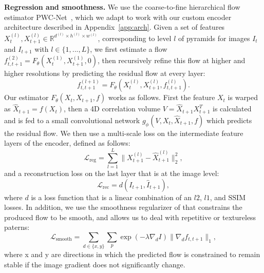 \documentclass{article} %
\newcommand{\parspace}{\vspace{0mm}}
\begin{document}
\noindent\textbf{Regression and smoothness.} We use the coarse-to-fine hierarchical flow estimator PWC-Net~\citep{sun2018pwcnet}, which we adapt to work with our custom encoder architecture described in Appendix~\ref{app:arch}. Given a set of features $X_{t}^{(l)}, X_{t+1}^{(l)} \in \mathbb{R}^{d^{(l)} \times h^{(l)} \times w^{(l)}}$, corresponding to level $l$ of pyramids for images $I_{t}$ and $I_{t+1}$ with $l \in \{1, ..., L\}$, we first estimate a flow $f_{t,t+1}^{(2)} = F_{\theta}(X_{t}^{(1)}, X_{t+1}^{(1)}, 0)$, then recursively refine this flow at higher and higher resolutions by predicting the residual flow at every layer:
\begin{equation}
    f_{t,t+1}^{(l+1)} = F_{\theta}(X_{t}^{(l)}, X_{t+1}^{(l)}, f_{t,t+1}^{(l)}).
\end{equation}
Our estimator $F_{\theta}(X_{t}, X_{t+1}, f)$ works as follows. First the feature $X_{t}$ is warped as $\hat{X}_{t+1} = f(X_{t})$, then a 4D correlation volume $V = \hat{X}_{t+1}X_{t+1}^T$ is calculated and is fed to a small convolutional network $g_{\phi}(V, X_{t}, \hat{X}_{t+1}, f)$ which predicts the residual flow. We then use a multi-scale loss on the intermediate feature layers of the encoder, defined as follows:
\begin{equation} \label{eq:reg_loss}
    \mathcal{L}_{\mathrm{reg}} = \sum_{l=1}^{L} \| X^{(l)}_{t+1} - \hat{X}_{t+1}^{(l)} \|^{2}_{2},
\end{equation}
and a reconstruction loss on the last layer that is at the image level:
\begin{equation} \label{eq:reg_loss}
    \mathcal{L}_\mathrm{{rec}} = d(I_{t+1}, \hat{I}_{t+1}),
\end{equation}
where $d$ is a loss function that is a linear combination of an $l2$, $l1$, and $\mathrm{SSIM}$ losses. In addition, we use the smoothness regularizer of \citep{jonschkowski2020uflow} that constrains the produced flow to be smooth, and allows us to deal with repetitive or textureless paterns:
\begin{equation} \label{eq:smooth_loss}
    \mathcal{L}_{\mathrm{smooth}} = \sum_{d \in \{x,y\}} \sum_{p} \exp({-\lambda \nabla_d I}) \| \nabla_{d} f_{t,t+1} \|_1,
\end{equation}
where x and y are directions in which the predicted flow is constrained to remain stable if the image gradient does not significantly change.
\parspace
\end{document}
